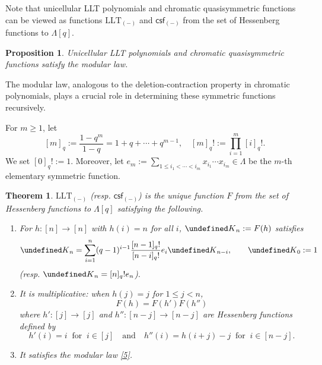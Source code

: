 \documentclass[11pt]{article}
\newtheorem{proposition}[theo]{Proposition}
\newtheorem{theorem}[theo]{Theorem}
\theoremstyle{definition}
\numberwithin{equation}{section}
\let\cal\undefined
\numberwithin{equation}{section}
\newcommand{\cal}{\mathcal}
\newcommand\cK{{\cal K}}
\newcommand{\aand}{\quad\text{and}\quad}
\newcommand\beq{\begin{equation}}
\newcommand\eeq{\end{equation}}
\newcommand\csf{\mathsf{csf}}
\newcommand\LLT{\mathrm{LLT}}
\begin{document}
Note that unicellular LLT polynomials and chromatic quasisymmetric functions can be viewed as  functions $\LLT_{(-)}$ and $\csf_{(-)}$ from the set of Hessenberg functions to $\Lambda[q]$.
\begin{proposition} 
\cite{AN, Ale, Lee} 
Unicellular LLT polynomials and chromatic quasisymmetric functions satisfy the modular law. 
\end{proposition}

The modular law, analogous to the deletion-contraction property in chromatic polynomials, plays a crucial role in determining these symmetric functions recursively.

For $m\geq 1$, let 
\[[m]_q:=\frac{1-q^m}{1-q}=1+q+\cdots +q^{m-1}, \quad  [m]_q!:=\prod_{i=1}^m [i]_q!.\] We set $[0]_q!:=1$. Moreover, let $e_m:=\sum_{1\leq i_1<\cdots <i_m}x_{i_1}\cdots x_{i_m}\in \Lambda$ be the $m$-th elementary symmetric function.

\begin{theorem} \cite{AN,AN2} \label{46}
	$\LLT_{(-)}$ (resp. $\csf_{(-)}$) is the unique function $F$ from the set of Hessenberg functions to $\Lambda[q]$ satisfying the following.
	\begin{enumerate}
		\item For $h:[n]\to [n]$ with $h(i)=n$ for all $i$, $\cK_n:=F(h)$ satisfies  
		\beq \label{13} \cK_n=\sum_{i=1}^n (q-1)^{i-1}\frac{[n-1]_q!}{[n-i]_q!}e_i \cK_{n-i}, \qquad \cK_0:=1\eeq
		(resp. $\cK_n=[n]_q!e_n$). 
		\item It is multiplicative: when $h(j)=j$ for $1\leq j<n$,
		\beq\label{n3} F(h)=F(h') F(h'')\eeq
		where $h':[j]\to[j]$ and $h'':[n-j]\to [n-j]$ are Hessenberg functions
		defined by
		\[h'(i)=i ~\text{ for }~i\in[j] \aand h''(i)=h(i+j)-j ~\text{ for }~i\in [n-j].\] 
		\item It satisfies the modular law \eqref{5}.
	\end{enumerate}
\end{theorem}
\end{document}
